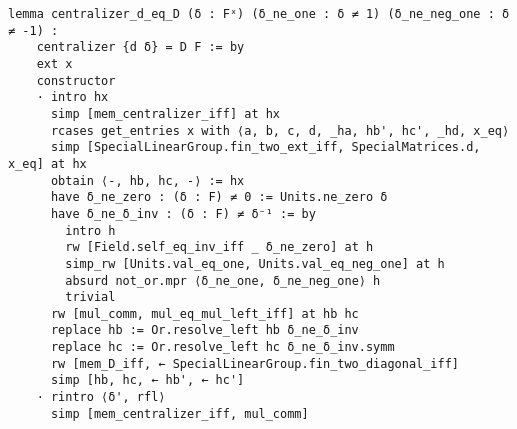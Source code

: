 \begin{footnotesize}
\begin{verbatim}
lemma centralizer_d_eq_D (δ : Fˣ) (δ_ne_one : δ ≠ 1) (δ_ne_neg_one : δ ≠ -1) :
    centralizer {d δ} = D F := by
    ext x
    constructor
    · intro hx
      simp [mem_centralizer_iff] at hx
      rcases get_entries x with ⟨a, b, c, d, _ha, hb', hc', _hd, x_eq⟩
      simp [SpecialLinearGroup.fin_two_ext_iff, SpecialMatrices.d, x_eq] at hx
      obtain ⟨-, hb, hc, -⟩ := hx
      have δ_ne_zero : (δ : F) ≠ 0 := Units.ne_zero δ
      have δ_ne_δ_inv : (δ : F) ≠ δ⁻¹ := by
        intro h
        rw [Field.self_eq_inv_iff _ δ_ne_zero] at h
        simp_rw [Units.val_eq_one, Units.val_eq_neg_one] at h
        absurd not_or.mpr ⟨δ_ne_one, δ_ne_neg_one⟩ h
        trivial
      rw [mul_comm, mul_eq_mul_left_iff] at hb hc
      replace hb := Or.resolve_left hb δ_ne_δ_inv
      replace hc := Or.resolve_left hc δ_ne_δ_inv.symm
      rw [mem_D_iff, ← SpecialLinearGroup.fin_two_diagonal_iff]
      simp [hb, hc, ← hb', ← hc']
    · rintro ⟨δ', rfl⟩
      simp [mem_centralizer_iff, mul_comm]
\end{verbatim}
\end{footnotesize}



